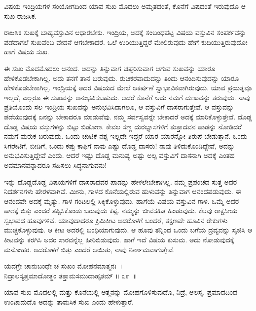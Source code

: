 \begin{artha}
ವಿಷಯ ಇಂದ್ರಿಯಗಳ ಸಂಯೋಗದಿಂದ ಯಾವ ಸುಖ ಮೊದಲು ಅಮೃತದಂತೆ, ಕೊನೆಗೆ ವಿಷದಂತೆ ಇರುವುದೊ ಆ ಸುಖ ರಾಜಸಿಕ.
\end{artha}

ರಾಜಸಿಕ ಸುಖಕ್ಕೆ ಬಾಹ್ಯವಸ್ತುವಿನ ಆಧಾರಬೇಕು. ಇಂದ್ರಿಯ, ಅದಕ್ಕೆ ಸಂಬಂಧಪಟ್ಟ ವಿಷಯ ವಸ್ತುವಿನ ಸಂಪರ್ಕವನ್ನು ಪಡೆದಾಗಲೆ ಸುಖವೆಂಬ ವೇದನೆ ಆಗಬೇಕಾದರೆ. ಒಲೆ ಉರಿಯುತ್ತಿದ್ದರೆ ಮೇಲಿರುವುದು ಹೇಗೆ ಕುದಿಯುತ್ತಿರುವುದೋ ಹಾಗೆ ವಿಷಯ ಸುಖ.

ಈ ಸುಖ ಮೊದಮೊದಲು ಆನಂದ. ಅದನ್ನು ತಿನ್ನುವಾಗ ಚಪ್ಪರಿಸುವಾಗ ಆಗುವ ಸುಖವನ್ನು ಯಾರೂ ಹೇಳಿಕೊಡಬೇಕಾಗಿಲ್ಲ. ಅದು ತನಗೆ ತಾನೆ ಬರುವುದು. ರುಚಿಕರವಾದುದನ್ನು ತಿಂದು ಆನಂದಿಸುವುದನ್ನು ಯಾರೂ ಹೇಳಿಕೊಡಬೇಕಾಗಿಲ್ಲ. ಇಂದ್ರಿಯಕ್ಕೆ ಅದರ ವಿಷಯದ ಮೇಲೆ ಆಕರ್ಷಣೆ ಸ್ವಾಭಾವಿಕವಾಗಿರುವುದು. ಯಾವ ಪ್ರಯತ್ನವೂ ಇಲ್ಲದೆ, ಎಲ್ಲರೂ ಈ ಸುಖವನ್ನು ಅನುಭವಿಸಬಹುದು. ಆದರೆ ಕೊನೆಗೆ ಅದು ನಮಗೆ ದುಃಖವನ್ನು ತರುವುದು. ನಾವು ಪ್ರತಿಯೊಂದು ಸಲ ಇಂದ್ರಿಯ ಸುಖವನ್ನು ಅನುಭವಿಸಿದಾಗಲೂ, ಆ ವಸ್ತುವಿಗೆ ದಾಸರಾಗುತ್ತೇವೆ. ಆ ವಸ್ತುವನ್ನು ಪಡೆಯುವುದಕ್ಕೆ ಏನನ್ನು ಬೇಕಾದರೂ ಮಾಡುವೆವು. ನಮ್ಮ ಸರ್ವಸ್ವವನ್ನೇ ಬೇಕಾದರೆ ಅದಕ್ಕೆ ಮಾರಿಕೊಳ್ಳುತ್ತೇವೆ. ದೊಡ್ಡ ದೊಡ್ಡ ವಿಷಯ ವಸ್ತುಗಳನ್ನು ಬಿಟ್ಟು ಬಿಡೋಣ. ಕೇವಲ ಸಣ್ಣ ದುರಭ್ಯಾಸಗಳಿಗೆ ತುತ್ತಾದವನ ಪಾಡನ್ನು ನೋಡಿದರೆ ನಮಗೆ ಮರುಕ ಬರುವುದು. ಒಂದು ಚುಟಿಕೆ ನಶ್ಯ ಇಲ್ಲದೇ ಇದ್ದರೆ ಯಾರ ಯಾರನ್ನೋ ತಿರುಪೆ ಬೇಡುತ್ತಾನೆ. ಒಂದು ಸಿಗರೇಟಿಗೆ, ಬೀಡಿಗೆ, ಒಂದು ಕಪ್ಪು ಕಾಫಿಗೆ ನಾವು ಎಷ್ಟು ದೊಡ್ಡ ದಾಸರು! ನಾವು ತಿಳಿದುಕೊಂಡಿದ್ದೇವೆ, ಅದನ್ನು ಅನುಭವಿಸುತ್ತಿದ್ದೇವೆ ಎಂದು. ಆದರೆ ಇಷ್ಟು ದೊಡ್ಡ ಮನುಷ್ಯ ಅಷ್ಟು ಅಲ್ಪ ವಸ್ತುವಿಗೆ ದಾಸನಾಗಿ ಅದಕ್ಕೆ ಎಂತಹ ಅವಮಾನವನ್ನಾದರೂ ಸಹಿಸಲು ಸಿದ್ಧನಾಗುವನು!

ಇನ್ನು ದೊಡ್ಡದೊಡ್ಡ ವಿಷಯಗಳಿಗೆ ದಾಸರಾದವರ ಪಾಡನ್ನು ಹೇಳಲೇಬೇಕಾಗಿಲ್ಲ. ನಮ್ಮ ಪ್ರಪಂಚದ ಸುತ್ತ ಅದರ ನಿದರ್ಶನಗಳು ಹೇರಳವಾಗಿವೆ. ಮೀನು, ಗಾಳದ ಕೊನೆಯಲ್ಲಿರುವ ಹುಳುವನ್ನು ತಿನ್ನುವಾಗ ಆನಂದಪಡುವುದು. ಈ ಆನಂದವೇ ಅದಕ್ಕೆ ಮೃತ್ಯು. ಗಾಳ ಗಂಟಲಲ್ಲಿ ಸಿಕ್ಕಿಕೊಳ್ಳುವುದು. ಹಾಗೆಯೆ ವಿಷಯ ವಸ್ತುವಿನ ಗಾಳ. ಒಮ್ಮೆ ಅದರ ಪಾಶಕ್ಕೆ ಬಿತ್ತು ಎಂದರೆ ತಪ್ಪಿಸಿಕೊಂಡು ಬರುವುದು ಕಷ್ಟ. ನಮ್ಮನ್ನು ಜೀವಸಹಿತ ಹಿಂಡುವುದು. ಕೆಲವು ರಾಕ್ಷಸೀಯ ಸ್ವಭಾವದ ಹೂವುಗಳಿವೆ. ಯಾವುದಾದರೂ ಕ್ರಿಮಿಕೀಟ ಅದರೊಳಗೆ ಬಂದರೆ, ತಕ್ಷಣವೇ ಹೂವಿನ ರೇಕುಗಳು ಮುಚ್ಚಿಕೊಳ್ಳುವುವು. ಆ ಕೀಟ ಅದರಲ್ಲಿ ಬಂಧಿಯಾಗುವುದು. ಆ ಹೂವು ತನ್ನಿಂದ ಒಂದು ಬಗೆಯ ದ್ರವ್ಯವನ್ನು ಸೃಜಿಸಿ ಆ ಕೀಟವನ್ನು ಕರಗಿಸಿ ಅದರ ಸಾರವನ್ನೆಲ್ಲ ಹೀರಿಬಿಡುವುದು. ಹಾಗೆ ಇದೆ ವಿಷಯ ಕುಸುಮ. ಅದು ನೋಡುವುದಕ್ಕೆ ಮನೋಹರ. ಅದರೊಳಗೆ ಬಿತ್ತು ಎಂದರೆ ಆಯಿತು, ನಾವು ನಿರ್ನಾಮವಾಗುತ್ತೇವೆ.

\begin{shloka}
ಯದಗ್ರೇ ಚಾನುಬಂಧೇ ಚ ಸುಖಂ ಮೋಹನಮಾತ್ಮನಃ~।\\ನಿದ್ರಾಲಸ್ಯಪ್ರಮಾದೋತ್ಥಂ ತತ್ತಾಮಸಮುದಾಹೃತಮ್ \hfill॥ ೩೯~॥
\end{shloka}

\begin{artha}
ಯಾವ ಸುಖ ಮೊದಲಲ್ಲಿ ಮತ್ತು ಕೊನೆಯಲ್ಲಿ ಆತ್ಮನನ್ನು ಮೋಹಗೊಳಿಸುವುದೊ, ನಿದ್ರೆ, ಆಲಸ್ಯ, ಪ್ರಮಾದದಿಂದ ಉಂಟಾದುದೊ ಅದನ್ನು ತಾಮಸಿಕ ಸುಖ ಎಂದು ಹೇಳುತ್ತಾರೆ.
\end{artha}

